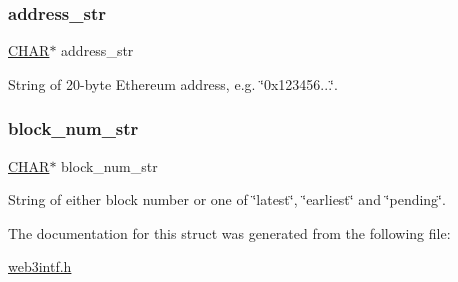 \subsubsection{\texorpdfstring{address\+\_\+str}{address\_str}}
{\footnotesize\ttfamily \mbox{\hyperlink{boattypes_8h_aebb9e13210d88d43e32e735ada43a425}{C\+H\+AR}}$\ast$ address\+\_\+str}



String of 20-\/byte Ethereum address, e.\+g. \char`\"{}0x123456...\char`\"{}. 

\mbox{\label{struct_t_param__eth__get_balance_af78d86478ad38ef1fecad6bfb059bd27}} 
\subsubsection{\texorpdfstring{block\+\_\+num\+\_\+str}{block\_num\_str}}
{\footnotesize\ttfamily \mbox{\hyperlink{boattypes_8h_aebb9e13210d88d43e32e735ada43a425}{C\+H\+AR}}$\ast$ block\+\_\+num\+\_\+str}



String of either block number or one of \char`\"{}latest\char`\"{}, \char`\"{}earliest\char`\"{} and \char`\"{}pending\char`\"{}. 



The documentation for this struct was generated from the following file\+:\begin{DoxyCompactItemize}
\item 
\mbox{\hyperlink{web3intf_8h}{web3intf.\+h}}\end{DoxyCompactItemize}

